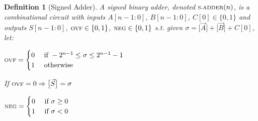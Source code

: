 \documentclass[12pt]{article}
\let\RA\Rightarrow
\newcommand{\scr}[1]{{\scriptstyle\textup{#1}}}
\newcommand*{\B}{\{0,1\}}
\newcommand{\trepr}[1]{\big[{#1}\big]}
\newtheorem{definition}[theorem]{Definition}
\begin{document}
\begin{definition}[Signed Adder]
  A signed binary adder, denoted $\scr{S-ADDER}(n)$, is a combinational circuit with inputs $A[n-1:0]$, $B[n-1:0]$, $C[0]\in\B$ and outputs $S[n-1:0]$, $\scr{OVF}\in\B$, $\scr{NEG}\in\B$ s.t. given $\sigma=\trepr{\vec{A}}+\trepr{\vec{B}}+C[0]$, let: 
  \begin{compactenum}[(i)]
    \item $\scr{OVF}=\begin{cases}0&\text{ if }-2^{n-1}\leq \sigma\leq 2^{n-1}-1\\1&\text{ otherwise}\end{cases}$
    \item If $\scr{OVF}=0\RA \trepr{\vec{S}}=\sigma$
    \item $\scr{NEG}=\begin{cases}0&\text{ if }\sigma\geq 0\\1&\text{ if }\sigma<0\end{cases}$
  \end{compactenum}
\end{definition}
\end{document}
